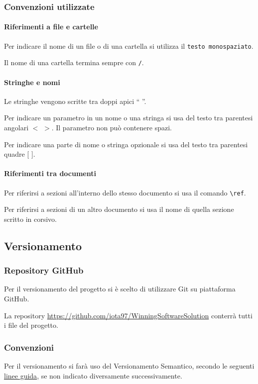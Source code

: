 \documentclass[a4paper, 12pt]{article}
\begin{document}
\subsubsection{Convenzioni utilizzate}\label{convenzioni}
\paragraph{Riferimenti a file e cartelle}
Per indicare il nome di un file o di una cartella si utilizza il  \texttt{testo monospaziato}.

Il nome di una cartella termina sempre con \texttt{/}.

\paragraph{Stringhe e nomi}
Le stringhe vengono scritte tra doppi apici `` ''.

Per indicare un parametro in un nome o una stringa si usa del testo tra parentesi angolari $<$ $>$. Il parametro non può contenere spazi.

Per indicare una parte di nome o stringa opzionale si usa del testo tra parentesi quadre [ ].

\paragraph{Riferimenti tra documenti}
Per riferirsi a sezioni all'interno dello stesso documento si usa il comando \verb-\ref-.

Per riferirsi a sezioni di un altro documento si usa il nome di quella sezione scritto in corsivo.



\subsection{Versionamento}


\subsubsection{Repository GitHub}\label{configurazione-github}
Per il versionamento del progetto si è scelto di utilizzare Git su piattaforma GitHub.

La repository \url{https://github.com/iota97/WinningSoftwareSolution} conterrà tutti i file del progetto.

\subsubsection{Convenzioni}
Per il versionamento si farà uso del Versionamento Semantico, secondo le seguenti \href{https://semver.org/lang/it/#specifica-di-versionamento-semantico-semver}{linee guida}, se non indicato diversamente successivamente.
\end{document}
